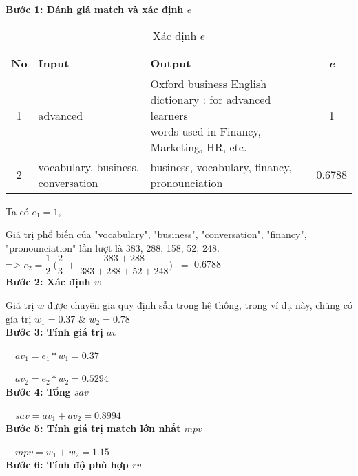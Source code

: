 \textbf{Bước 1: Đánh giá match và xác định $e$}\\

\begin{table}[H]
\begin{center}
\begin{tabular}{|c|p{4cm}|p{8cm}|c|}
\hline
\textbf{ No } & \textbf{Input} & \textbf{Output} & \textbf{\textit{\: e \:}} \\
\hline
1 & advanced & \pbox{8cm}{Oxford business English dictionary : for advanced learners\\words used in Financy, Marketing, 
HR, etc.} & 1\\
\hline
2 & vocabulary, business, conversation & business, vocabulary, financy, pronounciation & 0.6788\\
\hline
\end{tabular}
\caption{Xác định $e$}
\label{CaculateE}
\end{center}
\end{table}

Ta có $e_1 = 1$,

Giá trị phổ biến của "vocabulary", "business", "conversation", "financy", "pronounciation" lần lượt là 383, 288, 158, 52, 248.\\ 

=> $e_2 = \dfrac{1}{2}\:\Big(\dfrac{2}{3}\:+\:\dfrac{383+288}{383+288+52+248}\Big)$ $~=$ 0.6788 \\

\textbf{Bước 2: Xác định $w$}

Giá trị $w$ được chuyên gia quy định sẵn trong hệ thống, trong ví dụ này, chúng có gía trị $w_1 = 0.37$ \:\&\: $w_2 = 0.78$\\

\textbf{Bước 3: Tính giá trị $av$}\
\vskip 0.1in

$\>$$\>$$\>$ $av_1 = e_1 * w_1 = 0.37$

$\>$$\>$$\>$ $av_2 = e_2 * w_2 = 0.5294$\\

\textbf{Bước 4: Tổng $sav$}
\vskip 0.1in

$\>$$\>$$\>$ $sav = av_1 + av_2 = 0.8994$\\

\textbf{Bước 5: Tính giá trị match lớn nhất $mpv$}
\vskip 0.1in

$\>$$\>$$\>$ $mpv = w_1 + w_2 = 1.15 $\\

\textbf{Bước 6: Tính độ phù hợp $rv$}
\vskip 0.1in

